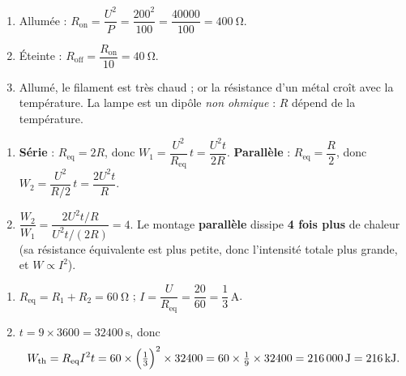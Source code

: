 \documentclass[11pt,a4paper]{article}
\begin{document}
\usetikzlibrary{babel}
\begin{corrige}
\begin{enumerate}[label=\alph*)]
  \item Allumée : $R_{\text{on}}=\dfrac{U^{2}}{P}=\dfrac{200^{2}}{100}=\dfrac{40000}{100}=\qty{400}{\ohm}$.
  \item Éteinte : $R_{\text{off}}=\dfrac{R_{\text{on}}}{10}=\qty{40}{\ohm}$.
  \item Allumé, le filament est très chaud ; or la résistance d'un métal croît avec la température. La
        lampe est un dipôle \emph{non ohmique} : $R$ dépend de la température.
\end{enumerate}
\end{corrige}

\begin{corrige}
\begin{enumerate}[label=\alph*)]
  \item \textbf{Série} : $R_{\text{eq}}=2R$, donc $W_1=\dfrac{U^{2}}{R_{\text{eq}}}\,t=\dfrac{U^{2}t}{2R}$.\;
        \textbf{Parallèle} : $R_{\text{eq}}=\dfrac{R}{2}$, donc $W_2=\dfrac{U^{2}}{R/2}\,t=\dfrac{2U^{2}t}{R}$.
  \item $\dfrac{W_2}{W_1}=\dfrac{2U^{2}t/R}{U^{2}t/(2R)}=4$. Le montage \textbf{parallèle} dissipe
        \textbf{4 fois plus} de chaleur (sa résistance équivalente est plus petite, donc l'intensité
        totale plus grande, et $W\propto I^2$).
\end{enumerate}
\end{corrige}

\begin{corrige}
\begin{enumerate}[label=\alph*)]
  \item $R_{\text{eq}}=R_1+R_2=\qty{60}{\ohm}$ ; \; $I=\dfrac{U}{R_{\text{eq}}}=\dfrac{20}{60}=\dfrac{1}{3}\,\si{\ampere}$.
  \item $t=9\times3600=\qty{32400}{\second}$, donc
        \[ W_{\text{th}}=R_{\text{eq}}I^{2}t=60\times\Bigl(\tfrac{1}{3}\Bigr)^{2}\times32400
           =60\times\tfrac{1}{9}\times32400=\qty{216000}{\joule}=\qty{216}{\kilo\joule}. \]
\end{enumerate}
\end{corrige}
\end{document}
